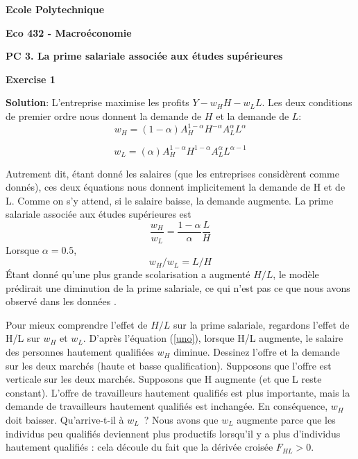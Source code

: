 \documentclass[11pt,a4paper]{article}
\begin{document}
\begin{center}
\textbf{Ecole Polytechnique}

\bigskip

\textbf{Eco 432 - Macro\'{e}conomie}

\bigskip

\textbf{PC 3. La prime salariale associée aux études supérieures}

\hspace{1.0in}
\end{center}


\begin{center}
\textbf{Exercise 1}
\end{center}





\textbf{Solution}: L'entreprise maximise les profits $Y-w_HH-w_LL$. Les deux conditions de premier ordre nous donnent la demande de $H$ et la demande de $L$: \begin{equation}
    w_H=(1-\alpha) A_H^{1-\alpha}H^{-\alpha}A_L^{\alpha}L^{\alpha}\label{uno}
\end{equation}

\begin{equation}
    w_L=(\alpha) A_H^{1-\alpha}H^{1-\alpha}A_L^{\alpha}L^{\alpha-1}
\end{equation}

Autrement dit, étant donné les salaires (que les entreprises considèrent comme donnés), ces deux équations nous donnent implicitement la demande de H et de L. Comme on s'y attend, si le salaire baisse, la demande augmente. La prime salariale associée aux études supérieures est 
\begin{equation}
\frac{w_H}{w_L}=\frac{1-\alpha}{\alpha}\frac{L}{H}
\end{equation}
 Lorsque $\alpha=0.5$, \begin{equation}
    w_H/w_L=L/H
\end{equation}
Étant donné qu'une plus grande scolarisation a augmenté $H/L$, le modèle prédirait une diminution de la prime salariale, ce qui n'est pas ce que nous avons observé dans les données .


Pour mieux comprendre l'effet de $H/L$ sur la prime salariale, regardons l'effet de H/L sur $w_H$ et $w_L$. D'après l'équation (\ref{uno}), lorsque H/L augmente, le salaire des personnes hautement qualifiées $w_H$ diminue. Dessinez l'offre et la demande sur les deux marchés (haute et basse qualification). Supposons que l'offre est verticale sur les deux marchés. Supposons que H augmente (et que L reste constant). L'offre de travailleurs hautement qualifiés est plus importante, mais la demande de travailleurs hautement qualifiés est inchangée. En conséquence, $w_H$ doit baisser.  Qu'arrive-t-il à $w_L$ ?
Nous avons que $w_L$ augmente parce que les individus peu qualifiés deviennent plus productifs lorsqu'il y a plus d'individus hautement qualifiés : cela découle du fait que la dérivée croisée $F_{HL}>0$.
\end{document}
